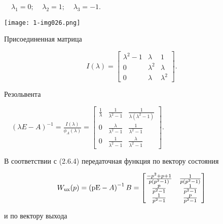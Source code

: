 \documentclass[a4paper]{article}
\newcommand\normalsubformula[1]{\text{\mathversion{normal}$#1$}}
\begin{document}
{\begin{russian}\sffamily
\ \  $λ_1=0;\;\;\;\;λ_2=1;\;\;\;\;λ_3=-1$.
\end{russian}}

{\centering  \texttt{[image: 1-img026.png]} \par}

\bigskip

{\begin{russian}\sffamily
Присоединенная матрица
\end{russian}}

\begin{equation*}
I\left(λ\right)=\left[\begin{matrix}λ^2-1&λ&1\\0&λ^2&λ\\0&λ&λ^2\end{matrix}\right].
\end{equation*}
{\begin{russian}\sffamily
Резольвента
\end{russian}}

{\begin{russian}\sffamily
\ \  $\left(\mathit{λE}-A\right)^{-1}=\frac{I\left(λ\right)}{ϕ_A\left(λ\right)}=\left[\begin{matrix}\frac 1 λ&\frac
1{λ^2-1}&\frac 1{λ(λ^2-1)}\\0&\frac λ{λ^2-1}&\frac 1{λ^2-1}\\0&\frac 1{λ^2-1}&\frac λ{λ^2-1}\end{matrix}\right]$.
\end{russian}}

{\begin{russian}\sffamily
В соответствии с (2.6.4) передаточная функция по вектору состояния
\end{russian}}

\begin{equation*}
W_{\normalsubformula{\text{ux}}}(p)=\left(\normalsubformula{\text{pE}}-A\right)^{-1}B=\left[\begin{matrix}\frac{-p^2+p+1}{p(p^2-1)}&\frac
1{p(p^2-1)}\\\frac p{p^2-1}&\frac 1{p^2-1}\\\frac 1{p^2-1}&\frac p{p^2-1}\end{matrix}\right]
\end{equation*}
{\begin{russian}\sffamily
и по вектору выхода
\end{russian}}
\end{document}
